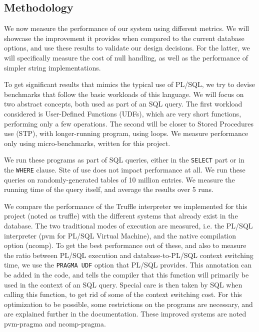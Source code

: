\documentclass[twoside,11pt,a4paper]{article}
\newcommand{\sql}[1]{\texttt{#1}}
\newcommand{\pls}[1]{\texttt{#1}}
\newcommand{\benchsystem}[1]{\textsf{#1}}
\newcommand{\pvm}{\benchsystem{pvm}}
\newcommand{\pvmg}{\benchsystem{pvm-pragma}}
\newcommand{\ncomp}{\benchsystem{ncomp}}
\newcommand{\ncpg}{\benchsystem{ncomp-pragma}}
\newcommand{\truffle}{\benchsystem{truffle}}
\begin{document}
\subsection{Methodology}


We now measure the performance of our system using different metrics. We will showcase the improvement it provides when compared to the current database options, and use these results to validate our design decisions. For the latter, we will specifically measure the cost of null handling, as well as the performance of simpler string implementations.

To get significant results that mimics the typical use of PL/SQL, we try to devise benchmarks that follow the basic workloads of this language. We will focus on two abstract concepts, both used as part of an SQL query. The first workload considered is User-Defined Functions (UDFs), which are very short functions, performing only a few operations. The second will be closer to Stored Procedures use (STP), with longer-running program, using loops. We measure performance only using micro-benchmarks, written for this project.

We run these programs as part of SQL queries, either in the \sql{SELECT} part or in the \sql{WHERE} clause. Site of use does not impact performance at all. We run these queries on randomly-generated tables of 10 million entries. We measure the running time of the query itself, and average the results over 5 runs.

We compare the performance of the Truffle interpreter we implemented for this project (noted as \truffle{}) with the different systems that already exist in the database. The two traditional modes of execution are measured, i.e. the PL/SQL interpreter (\pvm{} for PL/SQL Virtual Machine), and the native compilation option (\ncomp{}). To get the best performance out of these, and also to measure the ratio between PL/SQL execution and database-to-PL/SQL context switching time, we use the \pls{PRAGMA UDF} option that PL/SQL provides. This annotation can be added in the code, and tells the compiler that this function will primarily be used in the context of an SQL query. Special care is then taken by SQL when calling this function, to get rid of some of the context switching cost. For this optimization to be possible, some restrictions on the programs are necessary, and are explained further in the documentation. These improved systems are noted \pvmg{} and \ncpg{}.
\end{document}
